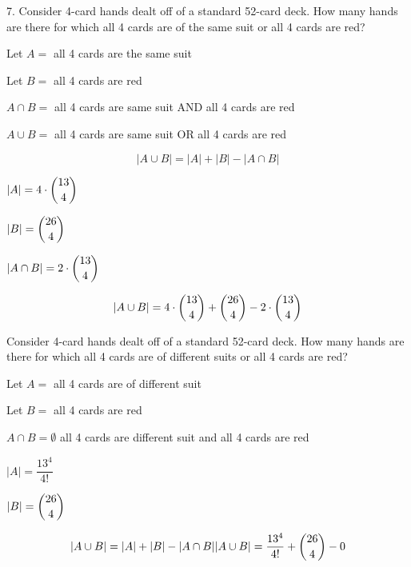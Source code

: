 \documentclass[openany, 12pt]{book}
\begin{document}
\begin{exercise}{}{}7. Consider 4-card hands dealt off of a standard 52-card deck.
	How many hands are there for which all 4 cards are of the same suit or all 4
	cards are red?
	\begin{alist}
		\item Let $A=$ all 4 cards are the same suit
		\item Let $B=$ all 4 cards are red
		\item $A\cap B=$ all 4 cards are same suit AND all 4 cards are red
		\item $A\cup B=$ all 4 cards are same suit OR all 4 cards are red
		\item
		$$
			|A \cup B | = |A| + |B| - |A \cap B|
		$$
		\item $|A| = 4\cdot\dbinom{13}{4}$
		\item $|B| = \dbinom{26}{4}$
		\item $|A\cap B| = 2\cdot\dbinom{13}{4}$
		\item
		$$
			|A \cup B | = 4\cdot\dbinom{13}{4} + \dbinom{26}{4} - 2\cdot\dbinom{13}{4}
		$$
	\end{alist}
\end{exercise}

\begin{exercise}{}{}
	Consider 4-card hands dealt off of a standard 52-card deck.
	How many hands are there for which all 4 cards are of different suits or all
	4 cards are red?
	\begin{alist}
		\item Let $A=$ all 4 cards are of different suit
		\item Let $B=$ all 4 cards are red
		\item $A\cap B=\emptyset$ all 4 cards are different suit and all 4 cards are red
		\item $|A| = \dfrac{13^4}{4!}$
		\item $|B| = \dbinom{26}{4}$
		\item
		$$
			|A \cup B | = |A| + |B| - |A \cap B|
			|A \cup B | = \dfrac{13^4}{4!} + \dbinom{26}{4} - 0
		$$
	\end{alist}
\end{exercise}
\end{document}
